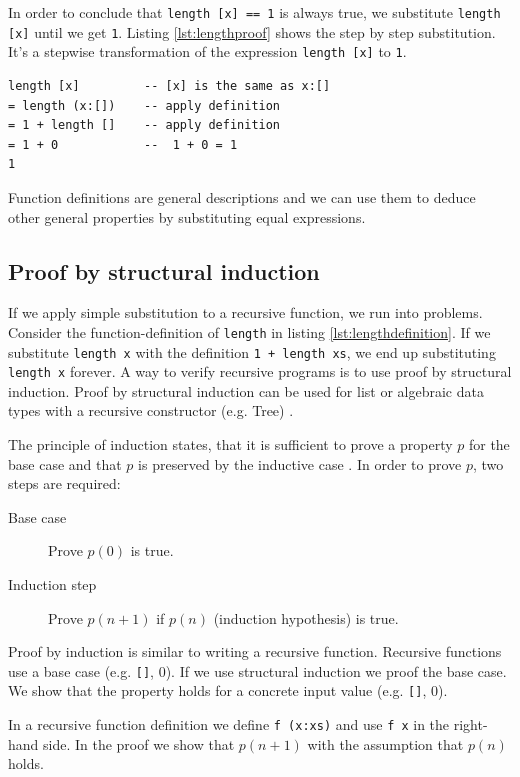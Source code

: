In order to conclude that \verb|length [x] == 1| is always true, we substitute \verb|length [x]| until we get \verb|1|. Listing \ref{lst:lengthproof} shows the step by step substitution. It's a stepwise transformation of the expression \verb|length [x]| to \verb|1|.
\begin{lstlisting}[caption={step by step substitution of {\ttfamily length}},label={lst:lengthproof}]
length [x]         -- [x] is the same as x:[]
= length (x:[])    -- apply definition
= 1 + length []    -- apply definition
= 1 + 0            --  1 + 0 = 1
1
\end{lstlisting}
Function definitions are general descriptions and we can use them to deduce other general properties by substituting equal expressions.

\subsection{Proof by structural induction}
\label{sec:induction}

If we apply simple substitution to a recursive function, we run into problems.
Consider the \gls{function-definition} of \verb|length| in listing \ref{lst:lengthdefinition}.
If we substitute \verb|length x| with the definition \verb|1 + length xs|, we end up substituting \verb|length x| forever. A way to verify recursive programs is to use proof by structural induction.  
Proof by structural induction can be used for list or algebraic data types with a recursive constructor (e.g. Tree) \cite{Thompson}.

 The principle of induction states, that it is sufficient to prove a property $p$ for the base case and that $p$ is preserved by the inductive case \cite{Doets}. In order to prove $p$, two steps are required:
 \begin{description}
 \item[Base case] Prove $p(0)$ is true.
 \item[Induction step] Prove $p(n+1)$ if $p(n)$ (induction hypothesis) is true.
 \end{description}

Proof by induction is similar to writing a recursive function. Recursive functions use a base case (e.g. \verb|[]|, 0). 
If we use structural induction we proof the base case. We show that the property holds for a concrete input value (e.g. \verb|[]|, 0). 

In a recursive function definition we define \verb|f (x:xs)| and use \verb|f x| in the right-hand side. In the proof we show that $p(n+1)$ with the assumption that $p(n)$ holds.

